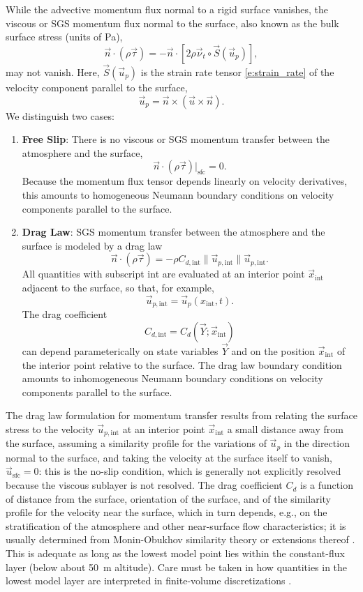 \documentclass{report}
\begin{document}
While the advective momentum flux normal to a rigid surface vanishes, the viscous or SGS momentum flux normal to the surface, also known as the bulk surface stress (units of Pa), 
\[
\vec{n} \cdot (\rho \vec{\tau}) = - \vec{n} \cdot \left[2\rho \vec{\nu}_t \circ \vec{S}(\vec{u}_p)\right],
\]
may not vanish. Here, $\vec{S}(\vec{u}_p)$ is the strain rate tensor \eqref{e:strain_rate} of the velocity component parallel to the surface,
 \[
    \vec{u}_p = \vec{n} \times (\vec{u} \times \vec{n}).
\]
We distinguish two cases:
\begin{enumerate}
    \item \textbf{Free Slip}: There is no viscous or SGS momentum transfer between the atmosphere and the surface,
    \[
    \vec{n} \cdot (\rho \vec{\tau})\bigl|_\mathrm{sfc} = 0.
    \]
    Because the momentum flux tensor depends linearly on velocity derivatives, this amounts to homogeneous Neumann boundary conditions on velocity components parallel to the surface.
    \item \textbf{Drag Law}: SGS momentum transfer between the atmosphere and the surface is modeled by a drag law 
    \begin{equation}\label{e:drag_law}
    \vec{n} \cdot (\rho \vec{\tau})  = - \rho C_{d, \mathrm{int}} \| \vec{u}_{p, \mathrm{int}} \| \vec{u}_{p, \mathrm{int}}.
    \end{equation}
    All quantities with subscript int are evaluated at an interior point $\vec{x}_\mathrm{int}$ adjacent to the surface, so that, for example,
    \[
   \vec{u}_{p, \mathrm{int}} = \vec{u}_p (x_\mathrm{int}, t).
    \]
    The drag coefficient
    \[
    C_{d, \mathrm{int}} = C_d(\vec{Y}; \vec{x}_\mathrm{int})
    \]
    can depend parameterically on state variables $\vec{Y}$ and on the position $\vec{x}_\mathrm{int}$ of the interior point relative to the surface. The drag law boundary condition amounts to inhomogeneous Neumann boundary conditions on velocity components parallel to the surface.
\end{enumerate}
The drag law formulation for momentum transfer results from relating the surface stress to the velocity $\vec{u}_{p, \mathrm{int}}$ at an interior point $\vec{x}_\mathrm{int}$ a small distance away from the surface, assuming a similarity profile for the variations of $\vec{u}_p$ in the direction normal to the surface, and taking the velocity at the surface itself to vanish, $\vec{u}_\mathrm{sfc} =0$: this is the no-slip condition, which is generally not explicitly resolved because the viscous sublayer is not resolved. The drag coefficient  $C_d$ is a function of distance from the surface, orientation of the surface, and of the similarity profile for the velocity near the surface, which in turn depends, e.g., on the stratification of the atmosphere and other near-surface flow characteristics; it is usually determined from Monin-Obukhov similarity theory or extensions thereof \citep{Foken06a}. This is adequate as long as the lowest model point lies within the constant-flux layer (below about 50~m altitude). Care must be taken in how quantities in the lowest model layer are interpreted in finite-volume discretizations  \citep{Nishizawa18a}.
\end{document}
